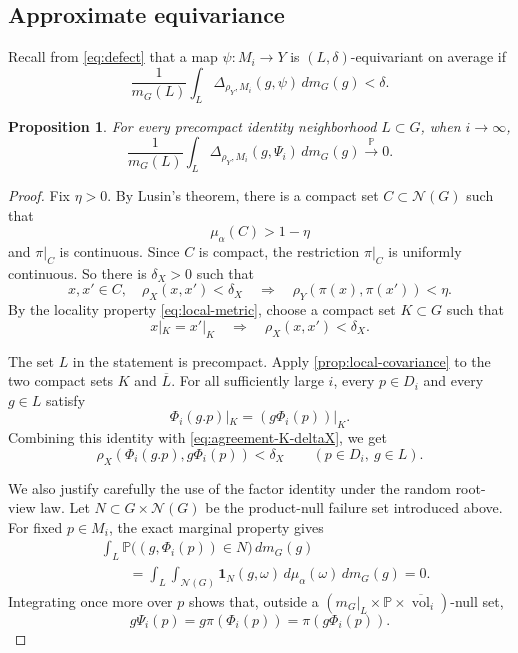 \documentclass[12pt]{amsart}
\newtheorem{proposition}[proposition]{Proposition}
\theoremstyle{definition}
\newcommand{\Haar}{m_G}
\newcommand{\vol}{\operatorname{vol}}
\newcommand{\cN}{\mathcal N}
\newcommand{\1}{\mathbf 1}
\newcommand{\dbar}{\overline{\vol}}
\newcommand{\dd}{\,d}
\begin{document}
\subsection{Approximate equivariance}

Recall from \eqref{eq:defect} that a map $\psi:M_i\to Y$ is $(L,\delta)$-equivariant on average if
\[
 \frac1{\Haar(L)}\int_L\Delta_{\rho_Y,M_i}(g,\psi)\dd\Haar(g)<\delta.
\]

\begin{proposition}\label{prop:avg-equivariance}
For every precompact identity neighborhood $L\subset G$, when $i \to \infty$,
\[
 \frac1{\Haar(L)}\int_L
 \Delta_{\rho_Y,M_i}(g,\Psi_i)\dd\Haar(g)
 \xrightarrow{\mathbb P}0.
\]
\end{proposition}

\begin{proof}
Fix $\eta>0$. By Lusin's theorem, there is a compact set $C\subset\cN(G)$ such that
\[
 \mu_\alpha(C)>1-\eta
\]
and $\pi|_C$ is continuous. Since $C$ is compact, the restriction $\pi|_C$ is uniformly continuous. So there is $\delta_X>0$ such that
\begin{equation}\label{eq:lusin-modulus}
 x,x'\in C,\quad \rho_X(x,x')<\delta_X
 \quad\Longrightarrow\quad
 \rho_Y(\pi(x),\pi(x'))<\eta.
\end{equation}
By the locality property \eqref{eq:local-metric}, choose a compact set $K\subset G$ such that
\begin{equation}\label{eq:agreement-K-deltaX}
 x|_K=x'|_K\quad\Longrightarrow\quad\rho_X(x,x')<\delta_X.
\end{equation}

The set $L$ in the statement is precompact. Apply \cref{prop:local-covariance} to the two compact sets $K$ and $\overline L$. For all sufficiently large $i$, every $p\in D_i$ and every $g\in L$ satisfy
\[
 \Phi_i(g.p)|_K=(g\Phi_i(p))|_K.
\]
Combining this identity with \eqref{eq:agreement-K-deltaX}, we get
\begin{equation}\label{eq:root-close-lusin}
 \rho_X(\Phi_i(g.p),g\Phi_i(p))<\delta_X
 \qquad(p\in D_i,\ g\in L).
\end{equation}

We also justify carefully the use of the factor identity under the random root-view law. Let $N\subset G\times\cN(G)$ be the product-null failure set introduced above. For fixed $p\in M_i$, the exact marginal property gives
\begin{align*}
 &\int_L\mathbb P\bigl((g,\Phi_i(p))\in N\bigr)\,d\Haar(g)\\
 &\qquad=\int_L\int_{\cN(G)}\1_N(g,\omega)\,d\mu_\alpha(\omega)\,d\Haar(g)=0.
\end{align*}
Integrating once more over $p$ shows that, outside a
$(\Haar|_L\times\mathbb P\times\dbar_i)$-null set,
\begin{equation}\label{eq:factor-identity-random}
 g\Psi_i(p)=g\pi(\Phi_i(p))=\pi(g\Phi_i(p)).
\end{equation}


\end{proof}
\end{document}
